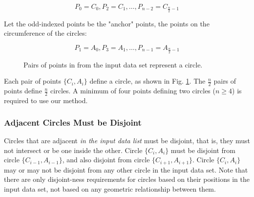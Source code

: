\documentclass{article}
\begin{document}
\[ P_0 = C_0, P_2 = C_1, \ldots, P_{n-2} = C_{\frac{n}{2}-1} \]

Let the odd-indexed points be the "anchor" points, the points on the circumference of the circles:

\[ P_1 = A_0, P_3 = A_1, \ldots, P_{n-1} = A_{\frac{n}{2}-1} \]


\begin{figure}[!h]
\centering
{}
\caption{Pairs of points in from the input data set represent a circle.}
\label{fig:pairs_of_points_define_a_circle}
\end{figure}


Each pair of points \( \{C_i, A_i\} \) define a circle, as shown in Fig. \ref{fig:pairs_of_points_define_a_circle}. The \( \frac{n}{2} \) pairs of points define \( \frac{n}{2} \) circles. A minimum of four points defining two circles (\( n \geq 4 \)) is required to use our method.

\subsubsection{Adjacent Circles Must be Disjoint}
Circles that are adjacent \textit{in the input data list} must be disjoint, that is, they must not intersect or be one inside the other. Circle \( \{C_i, A_i\} \) must be disjoint from circle \( \{C_{i-1}, A_{i-1}\} \), and also disjoint from circle \( \{C_{i+1}, A_{i+1}\} \). Circle \( \{C_i, A_i\} \) may or may not be disjoint from any other circle in the input data set. Note that there are only disjoint-ness requirements for circles based on their positions in the input data set, not based on any geometric relationship between them.
\end{document}

